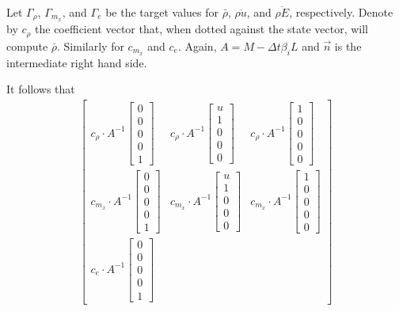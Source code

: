 \documentclass[letterpaper,11pt,nointlimits,reqno]{amsart}
\begin{document}
Let $\Gamma_\rho$, $\Gamma_{m_x}$, and $\Gamma_{e}$ be the target values for
$\bar{\rho}$, $\overline{\rho{}u}$, and $\overline{\rho{}E}$, respectively.
Denote by $c_\rho$ the coefficient vector that, when dotted against the state
vector, will compute $\bar{\rho}$.  Similarly for $c_{m_x}$ and $c_e$.  Again,
$A = M - \Delta{}t \beta_i L$ and $\vec{n}$ is the intermediate right hand
side.

It follows that
\begin{align}
  \begin{bmatrix}
    c_\rho \cdot A^{-1} \begin{bmatrix} 0 \\ 0 \\ 0 \\ 0 \\ 1 \end{bmatrix}
    &
    c_\rho \cdot A^{-1} \begin{bmatrix} u \\ 1 \\ 0 \\ 0 \\ 0 \end{bmatrix}
    &
    c_\rho \cdot A^{-1} \begin{bmatrix} 1 \\ 0 \\ 0 \\ 0 \\ 0 \end{bmatrix}
    \\
    c_{m_x} \cdot A^{-1} \begin{bmatrix} 0 \\ 0 \\ 0 \\ 0 \\ 1 \end{bmatrix}
    &
    c_{m_x} \cdot A^{-1} \begin{bmatrix} u \\ 1 \\ 0 \\ 0 \\ 0 \end{bmatrix}
    &
    c_{m_x} \cdot A^{-1} \begin{bmatrix} 1 \\ 0 \\ 0 \\ 0 \\ 0 \end{bmatrix}
    \\
    c_{e} \cdot A^{-1} \begin{bmatrix} 0 \\ 0 \\ 0 \\ 0 \\ 1 \end{bmatrix}

\end{bmatrix}
\end{align}
\end{document}
